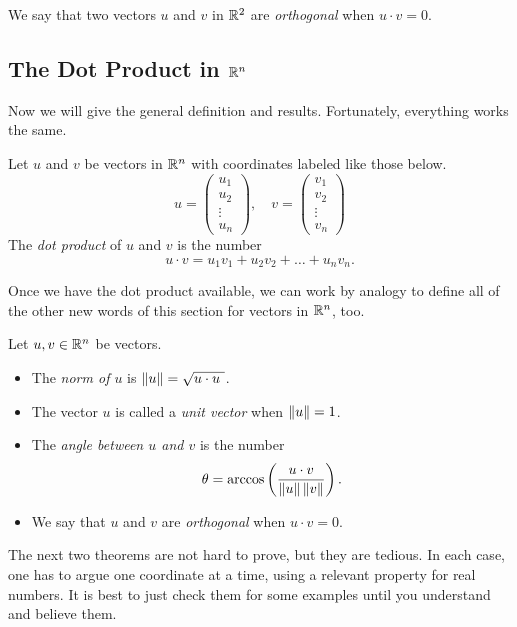 \documentclass[elementsmain.tex]{subfiles}
\begin{document}
\begin{definition}
We say that two vectors $u$ and $v$ in $\mathbb{R}^2$ are \emph{orthogonal} when $u\cdot v = 0$.
\end{definition}


\subsection*{The Dot Product in $\R^n$}

Now we will give the general definition and results. Fortunately, everything works the same.

\begin{definition}
Let $u$ and $v$ be vectors in $\R^n$ with coordinates labeled like those below.
\[
u = \begin{pmatrix}u_1 \\ u_2 \\ \vdots \\ u_n\end{pmatrix}, \quad
v = \begin{pmatrix}v_1 \\ v_2 \\ \vdots \\ v_n\end{pmatrix} 
\] 
The \emph{dot product} of $u$ and $v$ is the number
\[
u\cdot v = u_1v_1 + u_2v_2 + \dots + u_nv_n.
\]
\end{definition}

Once we have the dot product available, we can work by analogy to define all of the other new words of this section for vectors in $\R^n$, too.

\begin{definition}[Geometry in $\R^n$]
Let $u, v \in \mathbb{R}^n$ be vectors. 
\begin{itemize}
\item The \emph{norm of $u$} is $\norm{u} = \sqrt{u\cdot u\ }$. 
\item The vector $u$ is called a \emph{unit vector} when $\left\|u\right\|=1$.
\item The \emph{angle between $u$ and $v$} is the number 
\[
\theta = \arccos\left(\frac{u\cdot v}{\left\|u\right\|\left\|v\right\|}\right).
\]
\item We say that $u$ and $v$ are \emph{orthogonal} when $u\cdot v = 0$.
\end{itemize}
\end{definition}



The next two theorems are not hard to prove, but they are tedious. In each case,
one has to argue one coordinate at a time, using a relevant property for real numbers.
It is best to just check them for some examples until you understand and believe them.
\end{document}
